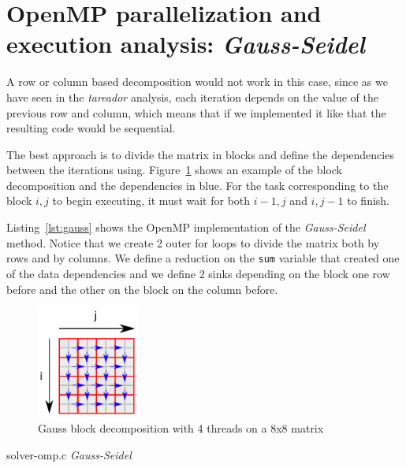 \pagebreak
\section{OpenMP parallelization and execution analysis: \emph{Gauss-Seidel}}


A row or column based decomposition would not work in this case, since as we have seen in the
\emph{tareador} analysis, each iteration depends on the value of the previous row and column,
which means that if we implemented it like that the resulting code would be sequential.

The best approach is to divide the matrix in blocks and define the dependencies between the
iterations using. Figure~\ref{fig:blocks-gauss} shows an example
of the block decomposition and the dependencies in blue. For the task corresponding to
the block $i,j$ to begin executing, it must wait for both $i-1, j$ and $i, j-1$ to finish.

Listing~\ref{lst:gauss} shows the OpenMP implementation of the \emph{Gauss-Seidel} method. Notice that we create 2
outer for loops to divide the matrix both by rows and by columns. We define a reduction on the \texttt{sum}
variable that created one of the data dependencies and we define 2 sinks depending on
the block one row before and the other on the block on the column before.

\begin{figure}[H]
    \centering
    \includegraphics[width=0.3\textwidth]{gauss_blocks}
    \caption{Gauss block decomposition with 4 threads on a 8x8 matrix}%
    \label{fig:blocks-gauss}
\end{figure}

\begin{listing}[H]
    \caption{solver-omp.c \emph{Gauss-Seidel}}%
    \label{lst:gauss}
    \inputminted[firstline=57,lastline=89]{c}{code/solver-omp.c}
\end{listing}

